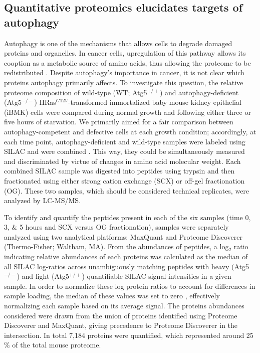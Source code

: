 \subsection{Quantitative proteomics elucidates targets of autophagy}
  
 Autophagy is one of the mechanisms that allows cells to degrade damaged proteins and organelles.  In cancer cells, upregulation of this pathway allows its cooption as a metabolic source of amino acids, thus allowing the proteome to be redistributed \cite{Rabinowitz:2010fx}.  Despite autophagy's importance in cancer, it is not clear which proteins autophagy primarily affects.  To investigate this question, the relative proteome composition of wild-type (WT; Atg5$^{+/+}$) and  autophagy-deficient (Atg5$^{-/-}$) HRas$^{G12V}$-transformed immortalized baby mouse kidney epithelial (iBMK) cells \cite{Guo:2011ba} were compared during normal growth and following either three or five hours of starvation.  We primarily aimed for a fair comparison between autophagy-competent and defective cells at each growth condition; accordingly, at each time point, autophagy-deficient and wild-type samples were labeled using SILAC and were combined \cite{Ong:2002tf}. This way, they could be simultaneously measured and discriminated by virtue of changes in amino acid molecular weight.  Each combined SILAC sample was digested into peptides using trypsin and then fractionated using either strong cation exchange (SCX) or off-gel fractionation (OG).  These two samples, which should be considered technical replicates, were analyzed by LC-MS/MS.  
 
To identify and quantify the peptides present in each of the six samples (time 0, 3, $\&$ 5 hours and SCX versus OG fractionation), samples were separately analyzed using two analytical platforms: MaxQuant \cite{Cox:2008ir} and Proteome Discoverer (Thermo-Fisher; Waltham, MA). From the abundances of peptides, a log$_{2}$ ratio indicating relative abundances of each proteins was calculated as the median of all SILAC log-ratios across unambiguously matching peptides with heavy (Atg5$^{-/-}$) and light (Atg5$^{+/+}$) quantifiable SILAC signal intensities in a given sample. In order to normalize these log protein ratios to account for differences in sample loading, the median of these values was set to zero \cite{Cox:2008ir}, effectively normalizing each sample based on its average signal. The proteins abundances considered were drawn from the union of proteins identified using Proteome Discoverer and MaxQuant, giving precedence to Proteome Discoverer in the intersection. In total 7,184 proteins were quantified, which represented around 25$\%$ of the total mouse proteome.
 
